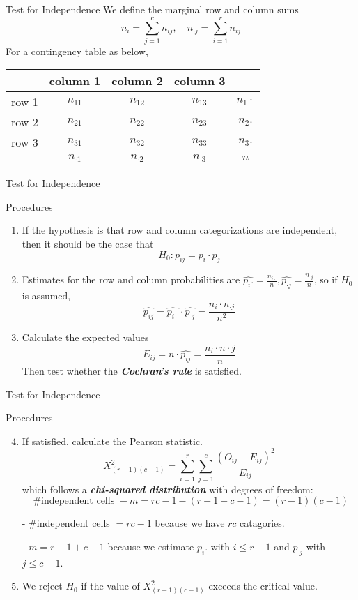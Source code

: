 \documentclass{beamer}
\newcommand{\bb}[1]{\textcolor{antiquefuchsia}{\textbf{\textit{#1}}}}
\begin{document}
\begin{frame}{Test for Independence}
We define the marginal row and column sums
$$
n_{i}=\sum_{j=1}^{c} n_{i j}, \quad n_{\cdot j}=\sum_{i=1}^{r} n_{i j}
$$
For a contingency table as below,
\begin{center}
\begin{tabular}{l|ccc|c} 
& column 1 & column 2 & column 3 & \\
\hline row 1 & $n_{11}$ & $n_{12}$ & $n_{13}$ & $n_{1} \cdot$ \\
row 2 & $n_{21}$ & $n_{22}$ & $n_{23}$ & $n_{2} .$ \\
row 3 & $n_{31}$ & $n_{32}$ & $n_{33}$ & $n_{3} .$ \\
\hline & $n_{\cdot 1}$ & $n_{\cdot 2}$ & $n_{\cdot 3}$ & $n$
\end{tabular}
\end{center}
\end{frame}

\begin{frame}{Test for Independence}
\begin{block}{Procedures}
\begin{enumerate}
\item If the hypothesis is that row and column categorizations are independent, then it should be the case that
$$
H_{0}: p_{i j}=p_{i} \cdot p_{j}
$$
\item Estimates for the row and column probabilities are $\widehat{p_{i} .}=\frac{n_{i \cdot}}{n}, \widehat{p_{\cdot j}}=\frac{n_{\cdot j}}{n}$, so if $H_{0}$ is assumed,
$$
\widehat{p_{i j}}=\widehat{p_{i \cdot}} \cdot \widehat{p_{\cdot j}}=\frac{n_{i} \cdot n_{\cdot j}}{n^{2}}
$$
\item Calculate the expected values
$$
E_{i j}=n \cdot \widehat{p_{i j}}=\frac{n_{i} \cdot n \cdot j}{n}
$$
Then test whether the \bb{Cochran's rule} is satisfied.
\end{enumerate}
\end{block}
\end{frame}


\begin{frame}{Test for Independence}
\begin{block}{Procedures}
\begin{enumerate}
\setcounter{enumi}{3}
\item If satisfied, calculate the Pearson statistic.
$$
X_{(r-1)(c-1)}^{2}=\sum_{i=1}^{r} \sum_{j=1}^{c} \frac{\left(O_{i j}-E_{i j}\right)^{2}}{E_{i j}}
$$
which follows a \bb{chi-squared distribution} with degrees of freedom:
$$
\text { \#independent cells }-m=r c-1-(r-1+c-1)=(r-1)(c-1)
$$
\begin{center}
- \#independent cells $=r c-1$ because we have $r c$ catagories.

- $m=r-1+c-1$ because we estimate $p_{i}$. with $i \leq r-1$ and $p_{\cdot j}$ with $j \leq c-1$.
\end{center}
\item We reject $H_{0}$ if the value of $X_{(r-1)(c-1)}^{2}$ exceeds the critical value.
\end{enumerate}
\end{block}
\end{frame}
\end{document}
